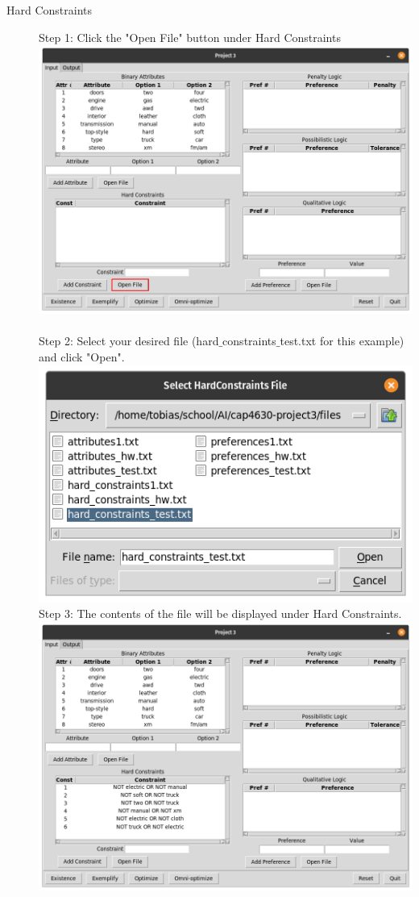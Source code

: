\documentclass[11pt]{article}
\begin{document}
\begin{description}
\item[Hard Constraints] Step 1: Click the "Open File" button under Hard Constraints\\
\includegraphics[scale=0.3]{input_constraints} \\\\
Step 2: Select your desired file (hard$\_$constraints$\_$test.txt for this example) and click "Open".\\
\includegraphics[scale=0.3]{select_constraints}\\
Step 3: The contents of the file will be displayed under Hard Constraints.\\
\includegraphics[scale=0.3]{constraints_imported}\\


\end{description}
\end{document}
